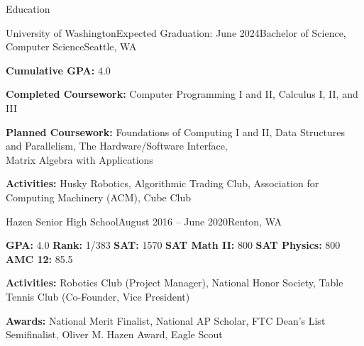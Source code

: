 \documentclass{resume} %
\begin{document}
\vspace{-1.0em} %


\begin{rSection}{Education}

\begin{education}{University of Washington}{Expected Graduation: June 2024}{Bachelor of Science, Computer Science}{Seattle, WA}
\item {\bf Cumulative GPA:} 4.0
\item {\bf Completed Coursework:} Computer Programming I and II, Calculus I, II, and III
\item {\bf Planned Coursework:} Foundations of Computing I and II, Data Structures and Parallelism, The Hardware/Software Interface, \\ Matrix Algebra with Applications
\item {\bf Activities:} Husky Robotics, Algorithmic Trading Club, Association for Computing Machinery (ACM), Cube Club
\end{education}

\begin{education}{Hazen Senior High School}{August 2016 – June 2020}{}{Renton, WA}
\item {\bf GPA:} 4.0 \hspace{5mm} {\bf Rank:} 1/383 \hspace{5mm} {\bf SAT:} 1570 \hspace{5mm} {\bf SAT Math II:} 800 \hspace{5mm} {\bf SAT Physics:} 800 \hspace{5mm} {\bf AMC 12:} 85.5
\item {\bf Activities:} Robotics Club (Project Manager), National Honor Society, Table Tennis Club (Co-Founder, Vice President)
\item {\bf Awards:} National Merit Finalist, National AP Scholar, FTC Dean's List Semifinalist, Oliver M. Hazen Award, Eagle Scout
\end{education}

\end{rSection}

\end{document}
